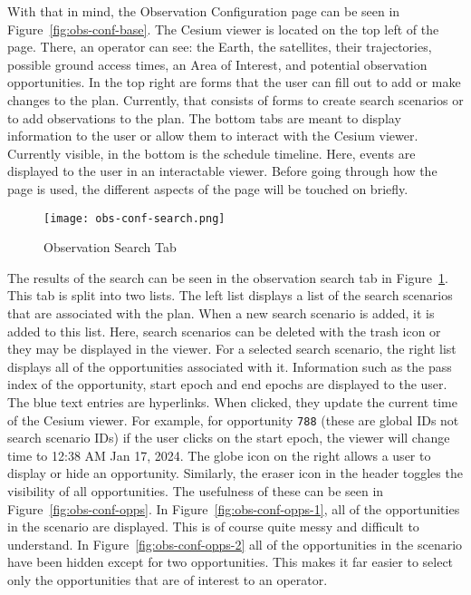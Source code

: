 With that in mind, the Observation Configuration page can be seen in
Figure~\ref{fig:obs-conf-base}. The Cesium viewer is located on the top left of
the page.  There, an operator can see: the Earth, the satellites, their
trajectories, possible ground access times, an Area of Interest, and potential
observation opportunities. In the top right are forms that the user can fill
out to add or make changes to the plan. Currently, that consists of forms to
create search scenarios or to add observations to the plan. The bottom tabs are
meant to display information to the user or allow them to interact with the
Cesium viewer. Currently visible, in the bottom is the schedule timeline.
Here, events are displayed to the user in an interactable viewer. Before going
through how the page is used, the different aspects of the page will be touched
on briefly. 


\begin{figure}
    \centering
    \texttt{[image: obs-conf-search.png]} 
    \caption{Observation Search Tab}
    \label{fig:obs-conf-search} 
\end{figure}

The results of the search can be seen in the observation search tab in
Figure~\ref{fig:obs-conf-search}. This tab is split into two lists. The left
list displays a list of the search scenarios that are associated with the plan.
When a new search scenario is added, it is added to this list. Here, search
scenarios can be deleted with the trash icon or they may be displayed in the
viewer. For a selected search scenario, the right list displays all of the
opportunities associated with it. Information such as the pass index of the
opportunity, start epoch and end epochs are displayed to the user. The blue
text entries are hyperlinks. When clicked, they update the current time of the
Cesium viewer. For example, for opportunity \texttt{788} (these are global IDs
not search scenario IDs) if the user clicks on the start epoch, the viewer will
change time to 12:38 AM Jan 17, 2024. The globe icon on the right allows a user
to display or hide an opportunity. Similarly, the eraser icon in the header
toggles the visibility of all opportunities.  The usefulness of these can be
seen in Figure~\ref{fig:obs-conf-opps}.  In Figure~\ref{fig:obs-conf-opps-1},
all of the opportunities in the scenario are displayed. This is of course quite
messy and difficult to understand. In Figure~\ref{fig:obs-conf-opps-2} all of
the opportunities in the scenario have been hidden except for two
opportunities. This makes it far easier to select only the opportunities that
are of interest to an operator.


